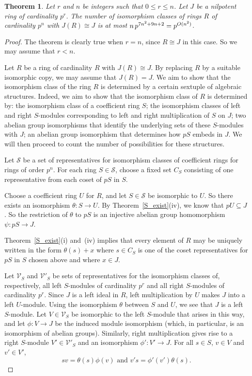 \documentclass[12pt]{article}
\newtheorem{Thm}{Theorem}[section]
\newcommand{\Oh}{\mathnormal{O}}
\begin{document}
\begin{Thm} \label{extension}
Let $r$ and $n$ be integers such that $0 \leq r \leq n$. Let $J$ be a nilpotent ring of cardinality $p^r$. The number of isomorphism classes of rings $R$ of cardinality $p^n$ with $J(R)\cong J$ is at most $n\, p^{7n^2+9n+2}=p^{\Oh(n^2)}$.
\end{Thm}
\begin{proof}
The theorem is clearly true when $r=n$, since $R\cong J$ in this case. So we may assume that $r<n$.

Let $R$ be a ring of cardinality $R$ with $J(R)\cong J$. By replacing $R$ by a suitable isomorphic copy, we may assume that $J(R)=J$. We aim to show that the isomorphism class of the ring $R$ is determined by a certain sextuple of algebraic structures. Indeed, we aim to show that the isomorphism class of $R$ is determined by: the isomorphism class of a coefficient ring $S$; the isomorphism classes of left and right $S$-modules corresponding to left and right multiplication of $S$ on $J$; two abelian group isomorphisms that identify the underlying sets of these $S$-modules with $J$; an abelian group isomorphism that determines how $pS$ embeds in $J$. We will then proceed to count the number of possibilities for these structures.

Let $\mathcal{S}$ be a set of representatives for isomorphism classes of coefficient rings for rings of order $p^n$. For each ring $S\in\mathcal{S}$, choose a fixed set $C_S$ consisting of one representative from each coset of $pS$ in $S$.

Choose a coefficient ring $U$ for $R$, and let  $S\in\mathcal{S}$ be isomorphic to $U$. So there exists an isomorphism $\theta:S\rightarrow U$. 
By Theorem~\ref{S_exist}(iv), we know that $pU\subseteq J$. So the restriction of $\theta$ to $pS$ is an injective abelian group homomorphism $\psi:pS\rightarrow J$.

Theorem~\ref{S_exist}(i) and~(iv) implies that every element of $R$ may be uniquely written in the form $\theta(s)+x$ where $s\in C_S$ is one of the coset representatives for $pS$ in $S$ chosen above and where $x\in J$.

Let $\mathcal{V}_S$ and $\mathcal{V}'_S$ be sets of representatives for the isomorphism classes of, respectively, all left $S$-modules of cardinality $p^r$ and all right $S$-modules of cardinality $p^r$. Since $J$ is a left ideal in $R$, left multiplication by $U$ makes $J$ into a left $U$-module. Using the isomorphism $\theta$ between $S$ and $U$, we see that $J$ is a left $S$-module. Let $V\in \mathcal{V}_S$ be isomorphic to the left $S$-module that arises in this way, and let $\phi:V\rightarrow J$ be the induced module isomorphism (which, in particular, is an isomorphism of abelian groups). Similarly, right multiplication gives rise to a right $S$-module $V'\in\mathcal{V}'_S$ and an isomorphism $\phi':V'\rightarrow J$. For all $s\in S$, $v\in V$ and $v'\in V'$,
\[
sv=\theta(s) \phi(v)\text{ and }v's=\phi'(v')\theta(s).
\]


\end{proof}
\end{document}
